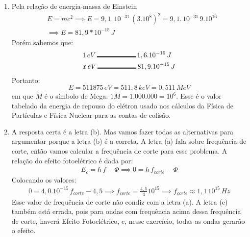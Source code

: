 \documentclass[12pt,letterpaper,fleqn]{article}
\begin{document}
\begin{enumerate}
    \item Pela relação de energia-massa de Einstein
    \begin{align*}
        &E=mc^2 \implies E =9,1.\,10^{-31}\,(3.10^8)^2 = 9,1.\,10^{-31}\,9.10^{16}\\
        &\implies E =81,9*10^{-15}\,J
    \end{align*}
    Porém sabemos que:
    \begin{align*}
        &1\,eV \,\rule{2cm}{0.5mm}\,1,6.10^{-19}\,J\\
        &x\,eV \,\rule{2cm}{0.5mm}\,81,9.10^{-15}\,J\\
    \end{align*}
    Portanto:
    \begin{equation*}
        \boxed{E= 511875\,eV = 511,8\, keV = 0,511\,MeV}
    \end{equation*}
    em que $M$ é o símbolo de Mega: $1M = 1.000.000 =10^6$. Esse é o valor tabelado da energia de repouso do elétron usado nos cálculos da Física de Partículas e Física Nuclear para as contas de colisão.
    
    \item A resposta certa é a letra (b). Mas vamos fazer todas as alternativas para argumentar porque a letra (b) é a correta. A letra (a) fala sobre frequência de corte, então vamos calcular a frequência de corte para esse problema. A relação do efeito fotoelétrico é dada por:
    \begin{align*}
        E_c = h\,f-\Phi \implies 0 = h\,f_{corte} - \Phi
    \end{align*}
    Colocando os valores:
    \begin{align*}
        0 = 4,0.10^{-15}\,f_{corte} - 4,5 \implies f_{corte} = \frac{4,5}{4}10^{15} \implies \boxed{f_{corte}\approx 1,1\,10^{15}\,Hz}
    \end{align*}
    Esse valor de frequência de corte não condiz com a letra (a). A letra (c) também está errada, pois para ondas com frequência acima dessa frequência de corte, haverá Efeito Fotoelétrico, e, nesse exercício, todas as ondas gerarão o efeito.
    

\end{enumerate}
\end{document}
